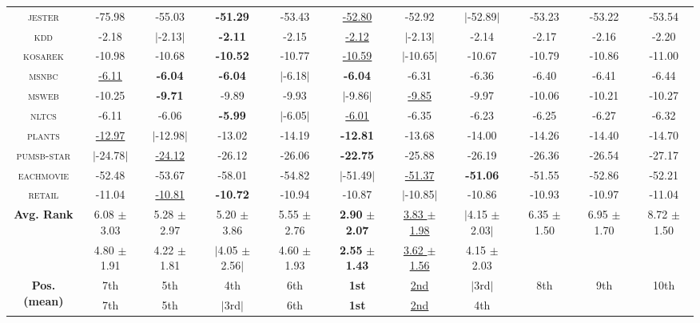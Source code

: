 \documentclass[14pt]{ffslides}
\newenvironment{vhcenterb}{\vspace*{\fill}\begin{center}}{\end{center}\vspace*{\fill}}
\begin{document}
\begin{vhcenterb}
{\begin{tabular}{c|ccccc|ccccc}
    \textsc{jester    } & -75.98 & -55.03 & \textbf{-51.29} & -53.43 & \underline{-52.80} & -52.92 & $|$-52.89$|$ & -53.23 & -53.22 & -53.54\\
    \textsc{kdd       } & -2.18 & $|$-2.13$|$ & \textbf{-2.11} & -2.15 & \underline{-2.12} & $|$-2.13$|$ & -2.14 & -2.17 & -2.16 & -2.20\\
    \textsc{kosarek   } & -10.98 & -10.68 & \textbf{-10.52} & -10.77 & \underline{-10.59} & $|$-10.65$|$ & -10.67 & -10.79 & -10.86 & -11.00\\
    \textsc{msnbc     } & \underline{-6.11} & \textbf{-6.04} & \textbf{-6.04} & $|$-6.18$|$ & \textbf{-6.04} & -6.31 & -6.36 & -6.40 & -6.41 & -6.44\\
    \textsc{msweb     } & -10.25 & \textbf{-9.71} & -9.89 & -9.93 & $|$-9.86$|$ & \underline{-9.85} & -9.97 & -10.06 & -10.21 & -10.27\\
    \textsc{nltcs     } & -6.11 & -6.06 & \textbf{-5.99} & $|$-6.05$|$ & \underline{-6.01} & -6.35 & -6.23 & -6.25 & -6.27 & -6.32\\
    \textsc{plants    } & \underline{-12.97} & $|$-12.98$|$ & -13.02 & -14.19 & \textbf{-12.81} & -13.68 & -14.00 & -14.26 & -14.40 & -14.70\\
    \textsc{pumsb-star} & $|$-24.78$|$ & \underline{-24.12} & -26.12 & -26.06 & \textbf{-22.75} & -25.88 & -26.19 & -26.36 & -26.54 & -27.17\\
    \textsc{eachmovie } & -52.48 & -53.67 & -58.01 & -54.82 & $|$-51.49$|$ & \underline{-51.37} & \textbf{-51.06} & -51.55 & -52.86 & -52.21\\
    \textsc{retail    } & -11.04 & \underline{-10.81} & \textbf{-10.72} & -10.94 & -10.87 & $|$-10.85$|$ & -10.86 & -10.93 & -10.97 & -11.04\\
    \hline
    \multirow{2}{*}[-0.15em]{\textbf{Avg. Rank}} & 6.08 $\pm$ 3.03 & 5.28 $\pm$ 2.97 & 5.20 $\pm$ 3.86 & 5.55 $\pm$ 2.76 & \textbf{2.90} $\bm{\pm}$ \textbf{2.07} & \underline{3.83 $\pm$ 1.98} & $|$4.15 $\pm$ 2.03$|$ & 6.35 $\pm$ 1.50 & 6.95 $\pm$ 1.70 & 8.72 $\pm$ 1.50 \\
                                                 & 4.80 $\pm$ 1.91 & 4.22 $\pm$ 1.81 & $|$4.05 $\pm$ 2.56$|$ & 4.60 $\pm$ 1.93 & \textbf{2.55} $\bm{\pm}$ \textbf{1.43} & \underline{3.62 $\pm$ 1.56} & 4.15 $\pm$ 2.03 \\
    \hline
    \multirow{2}{*}[-0.15em]{\textbf{Pos. (mean)}} & 7th & 5th & 4th & 6th & \textbf{1st} & \underline{2nd} & $|$3rd$|$ & 8th & 9th & 10th \\
                                                   & 7th & 5th & $|$3rd$|$ & 6th & \textbf{1st} & \underline{2nd} & 4th \\
    \hline
  \end{tabular}
  }
\end{vhcenterb}
\end{document}
